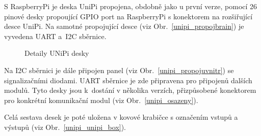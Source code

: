 \newpage

S RaspberryPi je deska UniPi propojena, obdobně jako u první verze, pomocí 26 pinové desky propoující GPIO port na RaspberryPi s konektorem na rozšiřující desce UniPi. Na samotné propojující desce (viz Obr.~\ref{unipi_propojbrain}) je vyvedena UART a~I2C sběrnice. 

\begin{figure}[!ht]
		\vspace{-10pt}
    \centering
			\hspace*{5mm}
			\caption{Detaily UNiPi desky}
			\vspace{-5pt}
\end{figure}

Na I2C sběrnici je dále připojen panel (viz Obr.~\ref{unipi_propojuvnitr}) se signalizačními diodami. UART sběrnice je zde připravena pro připojenů dalších modulů. Tyto desky jsou k~dostání v několika verzích, přizpůsobené konektorem pro konkrétní komunikační modul (viz Obr.~\ref{unipi_osazeny}).
 
Celá sestava desek je poté uložena v kovové krabičce s označením vstupů a výstupů (viz Obr.~\ref{unipi_unipi_box}).


